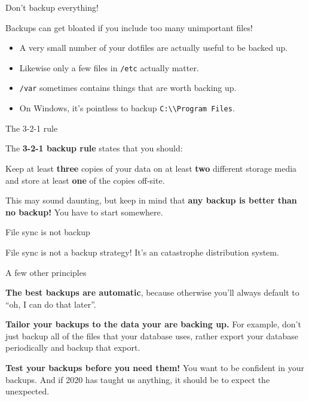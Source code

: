 \documentclass{lug}
\begin{document}
\begin{frame}{Don't backup everything!}

    Backups can get bloated if you include too many unimportant files!
    \pause

    \begin{itemize}[<+->]
        \item A very small number of your dotfiles are actually useful to be
            backed up.
        \item Likewise only a few files in \texttt{/etc} actually matter.
        \item \texttt{/var} sometimes contains things that are worth backing up.
        \item On Windows, it's pointless to backup
            \texttt{C:\textbackslash\textbackslash Program Files}.
    \end{itemize}

\end{frame}

\begin{frame}{The 3-2-1 rule}

    The \textbf{3-2-1 backup rule} states that you should: \pause

    Keep at least \textbf{three} copies of your data \pause on at least
    \textbf{two} different storage media \pause and store at least \textbf{one}
    of the copies off-site.

    \pause This may sound daunting, but keep in mind that \textbf{any backup is
    better than no backup!} You have to start somewhere.

\end{frame}

\begin{frame}{File sync is not backup}

    File sync is not a backup strategy! \pause It's an catastrophe distribution
    system.

\end{frame}

\begin{frame}{A few other principles}

    \textbf{The best backups are automatic}, because otherwise you'll always
    default to ``oh, I can do that later''.

    \pause
    \textbf{Tailor your backups to the data your are backing up.} For example,
    don't just backup all of the files that your database uses, rather export
    your database periodically and backup that export.

    \pause
    \textbf{Test your backups before you need them!} You want to be confident in
    your backups. And if 2020 has taught us anything, it should be to expect the
    unexpected.

\end{frame}
\end{document}
